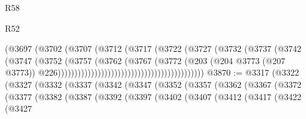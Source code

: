 \begin{lexlean}{R58}
\begin{lexlean}{R52}
\begin{coremodule}
{{{{{{{{{{{{{{{{{{{{{{{{{{{{{{{{{{{{{{{{{{{{{{{{{{{{{{{{{{{{{{{{{{{{{{{{{{{{{{{{{{{{{{{{{{{{{{{{{{{{{{{{{{{{{{{{{{{{{{{{{{{{{{{{{{{{{{{{{{{{{{{{{{{{{{{{{{{{{{{{{{{{{{{{{{{{{{{{{{{{{{{{{{{{{{{{{{{{{{                                                          (@3697
                                                            (@3702
                                                              (@3707
                                                                (@3712
                                                                  (@3717
                                                                    (@3722
                                                                      (@3727
                                                                        (@3732
                                                                          (@3737
                                                                            (@3742
                                                                              (@3747
                                                                                (@3752
                                                                                  (@3757
                                                                                    (@3762
                                                                                      (@3767
                                                                                        (@3772
                                                                                          (@203
                                                                                            (@204
                                                                                              @3773
                                                                                              (@207
                                                                                                @3773))
                                                                                            @226))))))))))))))))))))))))))))))))))))))))))))
@3870 := @3317
    (@3322
      (@3327
        (@3332
          (@3337
            (@3342
              (@3347
                (@3352
                  (@3357
                    (@3362
                      (@3367
                        (@3372
                          (@3377
                            (@3382
                              (@3387
                                (@3392
                                  (@3397
                                    (@3402
                                      (@3407
                                        (@3412
                                          (@3417
                                            (@3422
                                              (@3427
}}}}}}}}}}}}}}}}}}}}}}}}}}}}}}}}}}}}}}}}}}}}}}}}}}}}}}}}}}}}}}}}}}}}}}}}}}}}}}}}}}}}}}}}}}}}}}}}}}}}}}}}}}}}}}}}}}}}}}}}}}}}}}}}}}}}}}}}}}}}}}}}}}}}}}}}}}}}}}}}}}}}}}}}}}}}}}}}}}}}}}}}}}}}}}}}}}}}}}
\end{coremodule}
\end{lexlean}
\end{lexlean}
